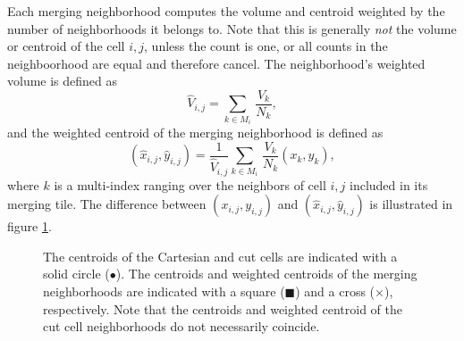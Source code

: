 \begin{itemize}
Each merging neighborhood computes the  volume and centroid weighted by
the number of neighborhoods it belongs to.  Note that this is generally
\textit{not} the volume or centroid of the cell $i,j$, unless the count is one, or
all counts in the neighboorhood are equal and therefore cancel.  
The neighborhood's weighted volume is defined as
\begin{equation}
\label{voldef}
{\widehat V}_{i,j} =  \sum_{k \in M_i } \,  \frac{V_k}{N_k},
\end{equation}
and the weighted centroid of the merging neighborhood is defined as
\begin{equation}
\label{centroiddef}
({\widehat x}_{i,j},{\widehat y}_{i,j}) = \frac{1}{\widehat V_{i,j}} \sum_{k \in M_i } \,  \frac{V_k}{N_k}(x_k,y_k),
\end{equation}
where $k$ is a multi-index ranging over the neighbors of cell $i,j$ included in its merging tile.  The difference between $(x_{i,j}, y_{i,j})$ and $(\widehat{x}_{i,j}, \widehat{y}_{i,j})$ is illustrated in figure \ref{fig:centroids}.


\begin{figure}[h]
    \centering
    \hspace*{.5in}
     \hfill
    \caption{\sf The centroids of the Cartesian and cut cells are indicated with a solid circle ($\bullet$).  The centroids and weighted centroids of the merging neighborhoods are indicated with a square ($\blacksquare$) and a cross ($\times$), respectively. Note that the centroids and weighted centroid of the cut cell neighborhoods do not necessarily coincide.}
    \label{fig:centroids}
\end{figure}

\end{itemize}

